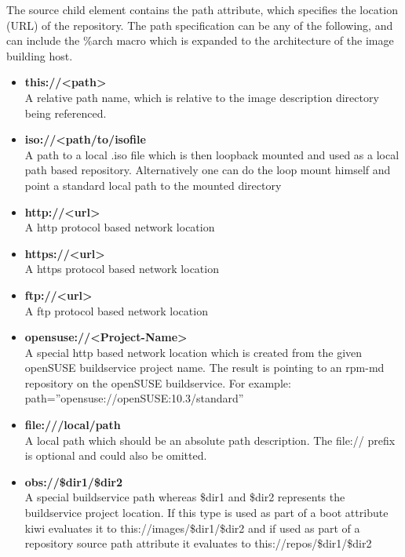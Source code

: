 The source child element contains the path attribute, which specifies
the location (URL) of the repository. The path specification can be any
of the following, and can include the \%arch macro which is expanded
to the architecture of the image building host.

\begin{itemize}
\item \textbf{this://<path>}\\
      A relative path name, which is relative to the image
      description directory being referenced.
\item \textbf{iso://<path/to/isofile}\\
      A path to a local .iso file which is then loopback mounted
      and used as a local path based repository. Alternatively one
      can do the loop mount himself and point a standard local path
      to the mounted directory
\item \textbf{http://<url>}\\
      A http protocol based network location
\item \textbf{https://<url>}\\
      A https protocol based network location
\item \textbf{ftp://<url>}\\
      A ftp protocol based network location
\item \textbf{opensuse://<Project-Name>}\\
      A special http based network location which is created from
      the given openSUSE buildservice project name. The result is
      pointing to an rpm-md repository on the openSUSE buildservice.
      For example:\\
      path=''opensuse://openSUSE:10.3/standard''
\item \textbf{file:///local/path}\\
      A local path which should be an absolute path description.
      The file:// prefix is optional and could also be omitted.
\item \textbf{obs://\$dir1/\$dir2}\\
      A special buildservice path whereas \$dir1 and \$dir2
      represents the buildservice project location. If this type is
      used as part of a boot attribute kiwi evaluates it to
      this://images/\$dir1/\$dir2 and if used as part of a repository
      source path attribute it evaluates to this://repos/\$dir1/\$dir2
\end{itemize}

